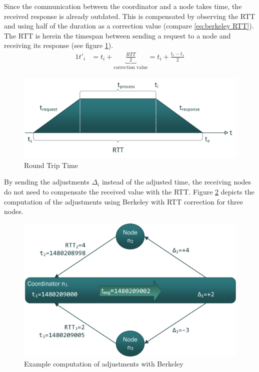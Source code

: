 Since the communication between the coordinator and a node takes time, the received response is already outdated. This is compensated by observing the \gls{RTT} and using half of the duration as a correction value (compare \ref{eq:berkeley RTT}). The \gls{RTT} is herein the timespan between sending a request to a node and receiving its response (see figure \ref{figure:berkeley RTT}).
\begin{alignat}{1}
t'_i &=t_i+\underbrace{\frac{RTT}{2}}_{\text{correction value}}=t_i+\frac{t_e-t_s}{2} \label{eq:berkeley RTT}
\end{alignat}

\begin{figure}[!htbp] %
	\caption{Round Trip Time} \label{figure:berkeley RTT}
	\includegraphics[scale=1.0]{figures/berkeley-ion.png}
\end{figure}

By sending the adjustments $\Delta_i$ instead of the adjusted time, the receiving nodes do not need to compensate the received value with the \gls{RTT}. Figure \ref{figure:berkeley example} depicts the computation of the adjustments using Berkeley with \gls{RTT} correction for three nodes. 

\begin{figure}[!htbp] %
	\caption{Example computation of adjustments with Berkeley} \label{figure:berkeley example}
	\includegraphics[scale=1.0]{figures/berkeley-example-ion.png}
\end{figure}

